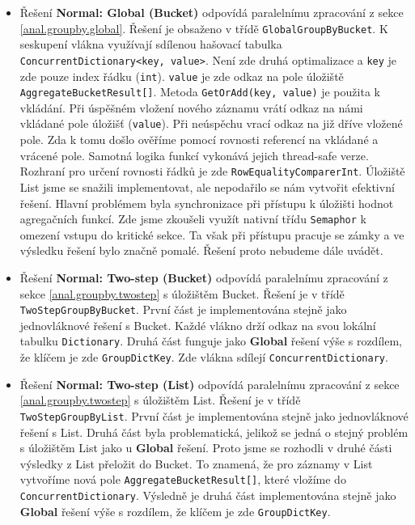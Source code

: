 \begin{itemize}
\item Řešení \textbf{Normal: Global (Bucket)} odpovídá paralelnímu zpracování z sekce \ref{anal.groupby.global}.
Řešení je obsaženo v třídě \texttt{GlobalGroupByBucket}.
K seskupení vlákna využívají sdílenou hašovací tabulka \texttt{ConcurrentDictionary<key, value>}.
Není zde druhá optimalizace a \texttt{key} je zde pouze index řádku (\texttt{int}). 
\texttt{value} je zde odkaz na pole úložiště \texttt{AggregateBucketResult[]}.
Metoda \texttt{GetOrAdd(key, value)} je použita k vkládání.
Při úspěšném vložení nového záznamu vrátí odkaz na námi vkládané pole úložišť (\texttt{value}).
Při neúspěchu vrací odkaz na již dříve vložené pole.
Zda k tomu došlo ověříme pomocí rovnosti referencí na vkládané a vrácené pole. 
Samotná logika funkcí vykonává jejich thread-safe verze. 
Rozhraní pro určení rovnosti řádků je zde \texttt{RowEqualityComparerInt}.
Úložiště List jsme se snažili implementovat, ale nepodařilo se nám vytvořit efektivní řešení.
Hlavní problémem byla synchronizace při přístupu k úložišti hodnot agregačních funkcí.
Zde jsme zkoušeli využít nativní třídu \texttt{Semaphor} k omezení vstupu do kritické sekce.
Ta však při přístupu pracuje se zámky a ve výsledku řešení bylo značně pomalé.
Řešení proto nebudeme dále uvádět.

\item Řešení \textbf{Normal: Two-step (Bucket)} odpovídá paralelnímu zpracování z sekce \ref{anal.groupby.twostep} s úložištěm Bucket.
Řešení je v třídě \texttt{TwoStepGroupByBucket}.
První část je implementována stejně jako jednovláknové řešení s Bucket.
Každé vlákno drží odkaz na svou lokální tabulku \texttt{Dictionary}.
Druhá část funguje jako \textbf{Global} řešení výše s rozdílem, že klíčem je zde \texttt{GroupDictKey}.
Zde vlákna sdílejí \texttt{ConcurrentDictionary}.

\item Řešení \textbf{Normal: Two-step (List) }odpovídá paralelnímu zpracování z sekce \ref{anal.groupby.twostep} s úložištěm List.
Řešení je v třídě \texttt{TwoStepGroupByList}.
První část je implementována stejně jako jednovláknové řešení s List.
Druhá část byla problematická, jelikož se jedná o stejný problém s úložištěm List jako u \textbf{Global} řešení.
Proto jsme se rozhodli v druhé části výsledky z List přeložit do Bucket.
To znamená, že pro záznamy v List vytvoříme nová pole \texttt{AggregateBucketResult[]}, které vložíme do \texttt{ConcurrentDictionary}.
Výsledně je druhá část implementována stejně jako \textbf{Global} řešení výše s rozdílem, že klíčem je zde \texttt{GroupDictKey}.


\end{itemize}

